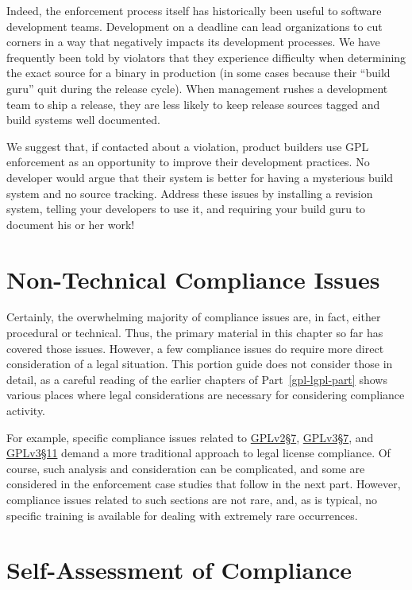 Indeed, the enforcement process itself has historically been useful to
software development teams.  Development on a deadline can lead
organizations to cut corners in a way that negatively impacts its
development processes.  We have frequently been told by violators that
they experience difficulty when determining the exact source for a binary
in production (in some cases because their ``build guru'' quit during the
release cycle).  When management rushes a development team to ship a
release, they are less likely to keep release sources tagged and build
systems well documented.

We suggest that, if contacted about a violation, product builders use GPL
enforcement as an opportunity to improve their development practices.  No
developer would argue that their system is better for having a mysterious
build system and no source tracking.  Address these issues by installing a
revision system, telling your developers to use it, and requiring your
build guru to document his or her work!


\section{Non-Technical Compliance Issues}

Certainly, the overwhelming majority of compliance issues are, in fact,
either procedural or technical.  Thus, the primary material in this chapter
so far has covered those issues.  However, a few compliance issues do require
more direct consideration of a legal situation.  This portion guide does not
consider those in detail, as a careful reading of the earlier chapters of
Part~\ref{gpl-lgpl-part} shows various places where legal considerations are
necessary for considering compliance activity.

For example, specific compliance issues related to
\hyperref[GPLv2s7]{GPLv2\S7}, \hyperref[GPLv3s7]{GPLv3\S7}, and
\hyperref[GPLv3s7]{GPLv3\S11} demand a more traditional approach to legal
license compliance.  Of course, such analysis and consideration can be
complicated, and some are considered in the enforcement case studies that
follow in the next part.  However, compliance issues related to such sections
are not rare, and, as is typical, no specific training is available for
dealing with extremely rare occurrences.

\section{Self-Assessment of Compliance}

